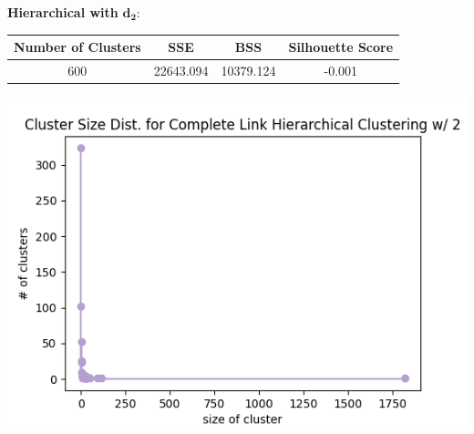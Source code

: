 \documentclass[fleqn]{article}
\begin{document}
\textbf{Hierarchical with }$\mathbf{d_2}$:\\
\begin{minipage}{0.65\textwidth}
\begin{tabular}{|c|c|c|c|}
	\hline
	\textbf{Number of Clusters} & \textbf{SSE} &\textbf{BSS} &\textbf{Silhouette Score}\\
	\hline
	600 & 22643.094 & 10379.124 & -0.001\\
	\hline
\end{tabular}
\end{minipage}
\begin{minipage}{0.35\textwidth}
\includegraphics[scale=0.35]{images/size_dist_hc_d2.png}\end{minipage}\\
\end{document}
